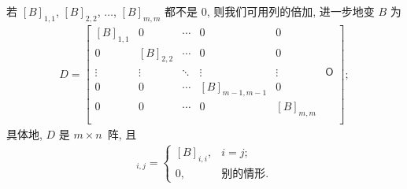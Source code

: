 \documentclass[../libro.tex]{subfiles}
\begin{document}
若 \([B]_{1,1}\), \([B]_{2,2}\), \(\dots\), \([B]_{m,m}\)
都不是 \(0\),
则我们可用列的倍加, 进一步地变 \(B\) 为
\begin{align*}
    D =
    \begin{bmatrix}
        [B]_{1,1} & 0         & \cdots & 0             & 0         & {}         \\
        0         & [B]_{2,2} & \cdots & 0             & 0         & {}         \\
        \vdots    & \vdots    & \ddots & \vdots        & \vdots    & \mathsf{O} \\
        0         & 0         & \cdots & [B]_{m-1,m-1} & 0         & {}         \\
        0         & 0         & \cdots & 0             & [B]_{m,m} & {}         \\
    \end{bmatrix};
\end{align*}
具体地, \(D\) 是 \(m \times n\)~阵,
且
\begin{align*}
    [D]_{i,j} =
    \begin{cases}
        [B]_{i,i}, & i = j;       \\
        0,         & \text{别的情形}.
    \end{cases}
\end{align*}
\end{document}
